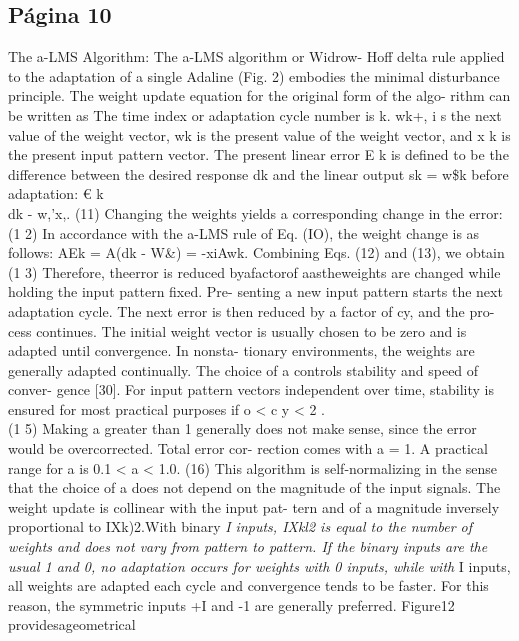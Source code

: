 \subsection{Página 10}\label{puxe1gina-10}

The a-LMS Algorithm: The a-LMS algorithm or Widrow- Hoff delta rule
applied to the adaptation of a single Adaline (Fig. 2) embodies the
minimal disturbance principle. The weight update equation for the
original form of the algo- rithm can be written as The time index or
adaptation cycle number is k. wk+, i s the next value of the weight
vector, wk is the present value of the weight vector, and x k is the
present input pattern vector. The present linear error E k is defined to
be the difference between the desired response dk and the linear output
sk = w\$k before adaptation: € k\\
dk - w,'x,. (11) Changing the weights yields a corresponding change in
the error: (1 2) In accordance with the a-LMS rule of Eq. (IO), the
weight change is as follows: AEk = A(dk - W\&) = -xiAwk. Combining Eqs.
(12) and (13), we obtain (1 3) Therefore, theerror is reduced
byafactorof aastheweights are changed while holding the input pattern
fixed. Pre- senting a new input pattern starts the next adaptation
cycle. The next error is then reduced by a factor of cy, and the pro-
cess continues. The initial weight vector is usually chosen to be zero
and is adapted until convergence. In nonsta- tionary environments, the
weights are generally adapted continually. The choice of a controls
stability and speed of conver- gence {[}30{]}. For input pattern vectors
independent over time, stability is ensured for most practical purposes
if o \textless{} c y \textless{} 2 .\\
(1 5) Making a greater than 1 generally does not make sense, since the
error would be overcorrected. Total error cor- rection comes with a = 1.
A practical range for a is 0.1 \textless{} a \textless{} 1.0. (16) This
algorithm is self-normalizing in the sense that the choice of a does not
depend on the magnitude of the input signals. The weight update is
collinear with the input pat- tern and of a magnitude inversely
proportional to IXk)2.With binary \emph{I inputs, IXkl2 is equal to the
number of weights and does not vary from pattern to pattern. If the
binary inputs are the usual 1 and 0, no adaptation occurs for weights
with 0 inputs, while with }I inputs, all weights are adapted each cycle
and convergence tends to be faster. For this reason, the symmetric
inputs +I and -1 are generally preferred. Figure12 providesageometrical
